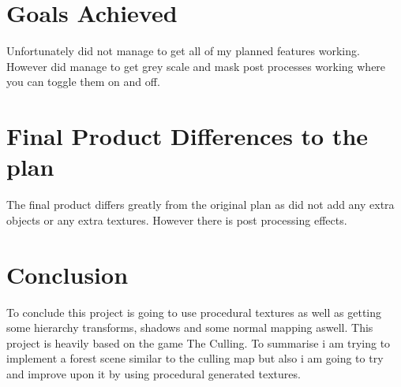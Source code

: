 \documentclass[10pt, a4paper]{article}
\newcommand{\figuremacro}[5]{
    \begin{figure}[#1]
        \centering
        \texttt{[image: \#2]}
        \caption[#3]{\textbf{#3}#4}
        \label{fig:#2}
    \end{figure}
}
\begin{document}
	\section{Goals Achieved}
	Unfortunately did not manage to get all of my planned features working.  However did manage to get grey scale and mask post processes working where you can toggle them on and off.  
	\section{Final Product Differences to the plan}
	The final product differs greatly from the original plan as did not add any extra objects or any extra textures.  However there is post processing effects.  
	\section{Conclusion}
	To conclude this project is going to use procedural textures as well as getting some hierarchy transforms, shadows and some normal mapping aswell.  This project is heavily based on the game The Culling.  To summarise i am trying to implement a forest scene similar to the culling map but also i am going to try and improve upon it by using procedural generated textures.  
	
	
	
	
    
	
    
    
\end{document}
